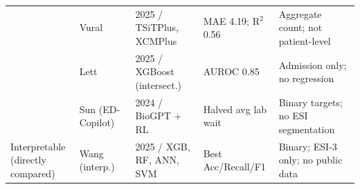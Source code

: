 \documentclass[conference]{IEEEtran}
\begin{document}
\begin{table}[!t]
\begin{tabular}{p{2.0cm}p{3.5cm}p{2.4cm}p{2.6cm}p{4.2cm}}
 & Vural~\cite{vural2025}              & 2025 / TSiTPlus, XCMPlus       & MAE 4.19; R$^2$ 0.56 & Aggregate count; not patient-level \\
 & Lett~\cite{lett2025}                & 2025 / XGBoost (intersect.)    & AUROC 0.85           & Admission only; no regression \\
 & Sun (ED-Copilot)~\cite{sun2024}     & 2024 / BioGPT + RL             & Halved avg lab wait  & Binary targets; no ESI segmentation \\
\midrule
\multirow{1}{*}{\parbox{2.0cm}{Interpretable\\(directly compared)}}
 & Wang (interp.)~\cite{wang2025interp} & 2025 / XGB, RF, ANN, SVM      & Best Acc/Recall/F1   & Binary; ESI-3 only; no public data \\
\bottomrule
\end{tabular}
\end{table}
\end{document}
